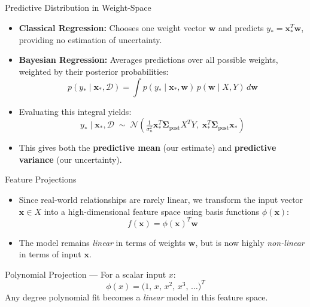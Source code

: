 \documentclass[aspectratio=169, 10pt,handout]{beamer}
\newcommand{\N}{\mathcal{N}}
\newcommand{\bw}{\mathbf{w}}
\newcommand{\bx}{\mathbf{x}}
\newcommand{\bSigma}{\boldsymbol{\Sigma}}
\newcommand{\sn}{\sigma_n^2}
\begin{document}
\begin{frame}{Predictive Distribution in Weight-Space}

  \begin{itemize}
    \item \textbf{Classical Regression:} Chooses one weight vector $\bw$ and
      predicts $y_*=\bx_*^T\bw$, providing no estimation of uncertainty.
    \item \textbf{Bayesian Regression:} Averages predictions over all possible
      weights, weighted by their posterior probabilities:
      \[
        p(y_*\mid\bx_*,\mathcal{D})
          = \int p(y_*\mid\bx_*,\bw)\,p(\bw\mid X, Y)\,d\bw
      \]
    \item Evaluating this integral yields:
      \[
        y_*\mid\bx_*,\mathcal{D}
          \;\sim\;
          \N\!\left(
            \tfrac{1}{\sn}\bx_*^T\bSigma_{\text{post}}X^T Y,\;
            \bx_*^T\bSigma_{\text{post}}\bx_*
          \right)
      \]
    \item This gives both the \textbf{predictive mean} (our estimate) and
      \textbf{predictive variance} (our uncertainty).
  \end{itemize}

\end{frame}

\begin{frame}{Feature Projections}

  \begin{itemize}
    \item Since real-world relationships are rarely linear, we transform the
      input vector $\bx \in X$ into a high-dimensional feature space using basis
      functions $\phi(\bx)$:
      \[
        f(\bx) = \phi(\bx)^T\bw
      \]
    \item The model remains \emph{linear} in terms of weights $\bw$, but is
      now highly \emph{non-linear} in terms of input $\bx$.
  \end{itemize}

  \vspace{4pt}
  \begin{examplebox}{Polynomial Projection --- For a scalar input $x$:}
    \[
      \phi(x) = \bigl(1,\,x,\,x^2,\,x^3,\,\dots\bigr)^T
    \]
    Any degree polynomial fit becomes a \emph{linear} model in this
    feature space.
  \end{examplebox}

\end{frame}
\end{document}
